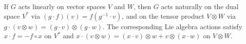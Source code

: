 If $G$ acts linearly on vector spaces $V$ and $W$, then $G$ acts naturally on the dual space $V^*$ via $(g \cdot f)(v) = f(g^{-1} \cdot v)$, and on the tensor product $V \otimes W$ via $g \cdot (v \otimes w) = (g \cdot v) \otimes (g \cdot w)$. The corresponding Lie algebra actions satisfy $x \cdot f = -f \circ x$ on $V^*$ and $x \cdot (v \otimes w) = (x \cdot v) \otimes w + v \otimes (x \cdot w)$ on $V \otimes W$.
